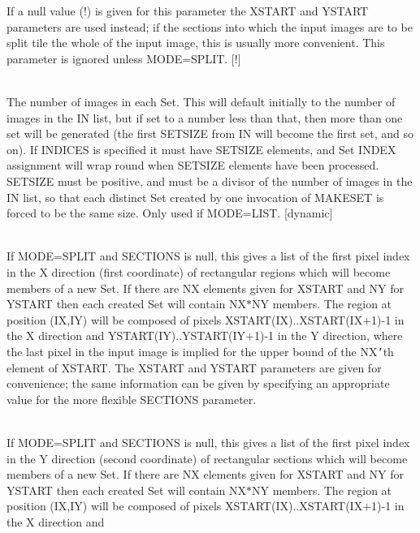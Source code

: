 \documentclass[twoside,11pt]{article}
\renewcommand{\_}{\texttt{\symbol{95}}}
\newcommand{\routine}[1]{{\sc #1}}
\newcommand{\sstsubsection}[1]{ \item[{#1}] \mbox{} \\}
\newcommand{\sstsubsection}[1]{\item[{#1}]}
\begin{document}
{{{         If a null value (!) is given for this parameter the
         XSTART and YSTART parameters are used instead; if the
         sections into which the input images are to be split
         tile the whole of the input image, this is usually
         more convenient.  This parameter is ignored unless
         MODE=SPLIT.
         [!]
      }
      \sstsubsection{
         SETSIZE = \_INTEGER (Read)
      }{
         The number of images in each Set.  This will default initially
         to the number of images in the IN list, but if set to a
         number less than that, then more than one set will be
         generated (the first SETSIZE from IN will become the first
         set, and so on).  If INDICES is specified it must have SETSIZE
         elements, and Set INDEX assignment will wrap round when
         SETSIZE elements have been processed.  SETSIZE must be
         positive, and must be a divisor of the number of images in
         the IN list, so that each distinct Set created by one
         invocation of \routine{MAKESET} is forced to be the same size.
         Only used if MODE=LIST.
         [dynamic]
      }
      \sstsubsection{
         XSTART( $*$ ) = \_INTEGER (Read)
      }{
         If MODE=SPLIT and SECTIONS is null, this gives a list of
         the first pixel index in the X direction (first coordinate)
         of rectangular regions which will become members of a new Set.
         If there are NX elements given for XSTART and NY for YSTART
         then each created Set will contain NX$*$NY members.  The
         region at position (IX,IY) will be composed of pixels
         XSTART(IX)..XSTART(IX$+$1)-1 in the X direction and
         YSTART(IY)..YSTART(IY$+$1)-1 in the Y direction, where the
         last pixel in the input image is implied for the upper
         bound of the NX{\tt '}th element of XSTART.  The
         XSTART and YSTART parameters are given for convenience; the
         same information can be given by specifying an appropriate
         value for the more flexible SECTIONS parameter.
      }
      \sstsubsection{
         YSTART( $*$ ) = \_INTEGER (Read)
      }{
         If MODE=SPLIT and SECTIONS is null, this gives a list of
         the first pixel index in the Y direction (second coordinate)
         of rectangular sections which will become members of a new Set.
         If there are NX elements given for XSTART and NY for YSTART
         then each created Set will contain NX$*$NY members.  The
         region at position (IX,IY) will be composed of pixels
         XSTART(IX)..XSTART(IX$+$1)-1 in the X direction and
}}}
\end{document}
